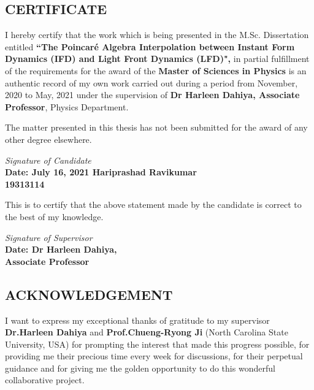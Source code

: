 \documentclass[12pt,a4paper]{report}
\begin{document}
\begin{center}
	\section*{CERTIFICATE}
	\noindent{\rule{\textwidth}{1.5pt}}
\end{center}
I hereby certify that the work which is being presented in the M.Sc. Dissertation entitled  \textbf{``The Poincaré Algebra Interpolation between Instant Form Dynamics (IFD) and Light Front Dynamics (LFD)",} in partial fulfillment of the requirements for the award of the \textbf{Master of Sciences in Physics} is an authentic record of my own work carried out during a period from November, 2020 to  May, 2021 under the supervision of \textbf{Dr Harleen Dahiya, Associate Professor}, Physics Department.
\vspace{30pt}
\par
The matter presented in this thesis has not been submitted for the award of any other degree elsewhere.
\vspace{20pt}

\begin{flushright}
	\textit{Signature of Candidate \\}
	\textbf{Date: July 16, 2021 \hfill Hariprashad Ravikumar \\ 19313114\\}
\end{flushright}
\vspace{30pt}

\par
This is to certify that the above statement made by the candidate is correct to the best of my knowledge.
\vspace{20pt}

\begin{flushright}
	\textit{Signature of Supervisor\\}
	\textbf{Date: \hfill Dr Harleen Dahiya,\\ Associate Professor}
\end{flushright}

\clearpage

\begin{center}
	\section*{ACKNOWLEDGEMENT}
	\noindent{\rule{\textwidth}{1.5pt}}
\end{center}
I want to express my exceptional thanks of gratitude to my supervisor \textbf{Dr.\@ Harleen Dahiya} and \textbf{Prof.\@ Chueng-Ryong Ji} (North Carolina State University, USA) for prompting the interest that made this progress possible, for providing me their precious time every week for discussions, for their perpetual guidance and for giving me the golden opportunity to do this wonderful collaborative project. 
\end{document}
